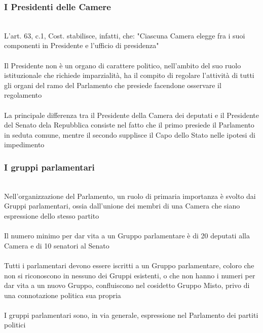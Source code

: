 \documentclass{report}
\begin{document}
\subsubsection{I Presidenti delle Camere}
\\
L'art. 63, c.1, Cost. stabilisce, infatti, che: "Ciascuna Camera elegge fra i suoi componenti in Presidente e l'ufficio di presidenza"
\\
\\
Il Presidente non è un organo di carattere politico, nell'ambito del suo ruolo istituzionale che richiede imparzialità, ha il compito di regolare l'attività di tutti gli organi del ramo del Parlamento che presiede facendone osservare il regolamento
\\
\\
La principale differenza tra il Presidente della Camera dei deputati e il Presidente del Senato dela Repubblica consiste nel fatto che il primo presiede il Parlamento in seduta comune, mentre il secondo supplisce il Capo dello Stato nelle ipotesi di impedimento
\\
\subsubsection{I gruppi parlamentari}
\\
Nell'organizzazione del Parlamento, un ruolo di primaria importanza è svolto dai Gruppi parlamentari, ossia dall'unione dei membri di una Camera che siano espressione dello stesso partito
\\
\\
Il numero minimo per dar vita a un Gruppo parlamentare è di 20 deputati alla Camera e di 10 senatori al Senato
\\
\\
Tutti i parlamentari devono essere iscritti a un Gruppo parlamentare, coloro che non si riconoscono in nessuno dei Gruppi esistenti, o che non hanno i numeri per dar vita a un nuovo Gruppo, confluiscono nel cosidetto Gruppo Misto, privo di una connotazione politica sua propria
\\
\\
I gruppi parlamentari sono, in via generale, espressione nel Parlamento dei partiti politici 
\\
\end{document}
